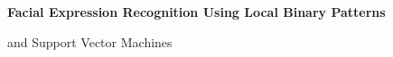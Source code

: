 %
%
%
%
\begin{titlepage}

   \vspace*{\fill}

   \noindent \colorbox{aaublue}{\parbox{\textwidth}{%
   \color{white}%
       \begin{center}
    \Huge{\textbf{
      Facial Expression Recognition Using Local Binary Patterns%
    }}
    \end{center}
    \begin{center}
      \Large{
        and Support Vector Machines%
      }
    \end{center}
}}

    \vfill
    

\end{titlepage}
